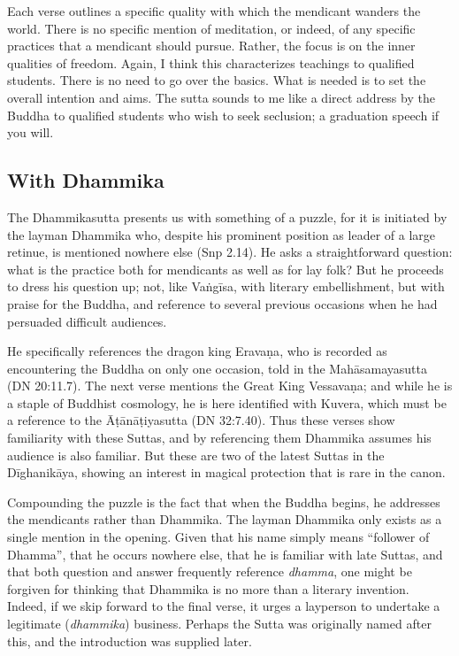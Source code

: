 \documentclass[12pt,openany]{book}%
\begin{document}
Each verse outlines a specific quality with which the mendicant wanders the world. There is no specific mention of meditation, or indeed, of any specific practices that a mendicant should pursue. Rather, the focus is on the inner qualities of freedom. Again, I think this characterizes teachings to qualified students. There is no need to go over the basics. What is needed is to set the overall intention and aims. The sutta sounds to me like a direct address by the Buddha to qualified students who wish to seek seclusion; a graduation speech if you will.

\subsection*{With Dhammika}

The Dhammikasutta presents us with something of a puzzle, for it is initiated by the layman Dhammika who, despite his prominent position as leader of a large retinue, is mentioned nowhere else (Snp 2.14). He asks a straightforward question: what is the practice both for mendicants as well as for lay folk? But he proceeds to dress his question up; not, like \textsanskrit{Vaṅgīsa}, with literary embellishment, but with praise for the Buddha, and reference to several previous occasions when he had persuaded difficult audiences.

He specifically references the dragon king \textsanskrit{Eravaṇa}, who is recorded as encountering the Buddha on only one occasion, told in the \textsanskrit{Mahāsamayasutta} (DN 20:11.7). The next verse mentions the Great King \textsanskrit{Vessavaṇa}; and while he is a staple of Buddhist cosmology, he is here identified with Kuvera, which must be a reference to the \textsanskrit{Āṭānāṭiyasutta} (DN 32:7.40). Thus these verses show familiarity with these Suttas, and by referencing them Dhammika assumes his audience is also familiar. But these are two of the latest Suttas in the \textsanskrit{Dīghanikāya}, showing an interest in magical protection that is rare in the canon.

Compounding the puzzle is the fact that when the Buddha begins, he addresses the mendicants rather than Dhammika. The layman Dhammika only exists as a single mention in the opening. Given that his name simply means “follower of Dhamma”, that he occurs nowhere else, that he is familiar with late Suttas, and that both question and answer frequently reference \textit{dhamma}, one might be forgiven for thinking that Dhammika is no more than a literary invention. Indeed, if we skip forward to the final verse, it urges a layperson to undertake a legitimate (\textit{dhammika}) business. Perhaps the Sutta was originally named after this, and the introduction was supplied later.
\end{document}
